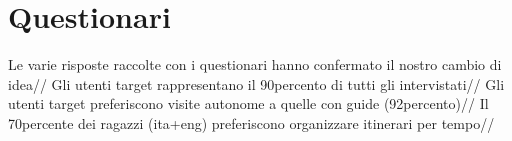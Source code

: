 \section{Questionari}

Le varie risposte raccolte con i questionari hanno confermato il nostro cambio di idea//
Gli utenti target rappresentano il 90percento di tutti gli intervistati//
Gli utenti target preferiscono visite autonome a quelle con guide (92percento)//
Il 70percente dei ragazzi (ita+eng) preferiscono organizzare itinerari per tempo//

